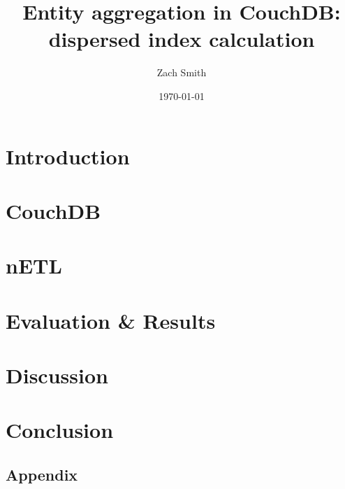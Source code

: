 \documentclass[
    parskip=full,
    a4paper
]{scrartcl}
\title{Entity aggregation in CouchDB: dispersed index calculation}
\author{Zach Smith}
\date{\today}
\begin{document}
\maketitle
\thispagestyle{empty}


\newpage

\tableofcontents
\newpage

\section{Introduction}




\section{CouchDB}



\section{nETL}




\section{Evaluation \& Results}




\section{Discussion}



\section{Conclusion}


\newpage

\begin{appendix}
    \section{Appendix}
    
    
    
    
    \listoffigures
    \listoftables
\end{appendix}
\newpage




\end{document}
